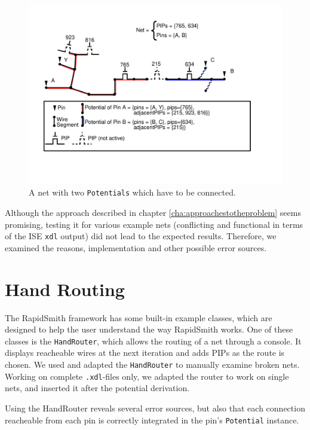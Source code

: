 \begin{figure}
\includegraphics[scale=1]{images/brokenpotentials.pdf}
\caption{A net with two \texttt{Potentials} which have to be connected.}
\label{fig:brokenpotentials}
\end{figure}

Although the approach described in chapter \ref{cha:approachestotheproblem} seems promising, testing it for various example nets (conflicting and functional in terms of the ISE \texttt{xdl} output) did not lead to the expected results. Therefore, we examined the reasons, implementation and other possible error sources.

\section{Hand Routing}
\label{sec:handrouting}

The RapidSmith framework has some built-in example classes, which are designed to help the user understand the way RapidSmith works. One of these classes is the \texttt{HandRouter}, which allows the routing of a net through a console. It displays reacheable wires at the next iteration and adds PIPs as the route is chosen. We used and adapted the \texttt{HandRouter} to manually examine broken nets. Working on complete \texttt{.xdl}-files only, we adapted the router to work on single nets, and inserted it after the potential derivation.

Using the HandRouter reveals several error sources, but also that each connection reacheable from each pin is correctly integrated in the pin's \texttt{Potential} instance. 

